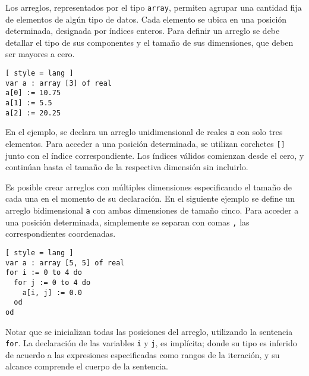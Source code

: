 Los arreglos, representados por el tipo \lstinline[style = lang]{array}, permiten agrupar una cantidad fija de elementos de algún tipo de datos.
Cada elemento se ubica en una posición determinada, designada por índices enteros.
Para definir un arreglo se debe detallar el tipo de sus componentes y el tamaño de sus dimensiones, que deben ser mayores a cero.

\begin{lstlisting}[ style = lang ]
var a : array [3] of real
a[0] := 10.75
a[1] := 5.5
a[2] := 20.25
\end{lstlisting}

\iffalse
Un tipo puntero \lstinline[style = lang]{pointer}, es un elemento que direcciona a una estructura en memoria.
Son utilizados para reservar, alojar, y liberar memoria a lo largo de la ejecución del programa.
Debido a su relevancia en el manejo dinámico de memoria, relegaremos su estudio hasta la sección correspondiente.

\begin{lstlisting}[ style = lang ]
var p : pointer of int
alloc(p)
#p := 5
free(p)
\end{lstlisting}
\fi

En el ejemplo, se declara un arreglo unidimensional de reales \lstinline[style = lang]{a} con solo tres elementos.
Para acceder a una posición determinada, se utilizan corchetes \lstinline[style = lang]{[]} junto con el índice correspondiente.
Los índices válidos comienzan desde el cero, y continúan hasta el tamaño de la respectiva dimensión sin incluirlo.

Es posible crear arreglos con múltiples dimensiones especificando el tamaño de cada una en el momento de su declaración.
En el siguiente ejemplo se define un arreglo bidimensional \lstinline[style = lang]{a} con ambas dimensiones de tamaño cinco.
Para acceder a una posición determinada, simplemente se separan con comas \lstinline[style = lang]{,} las correspondientes coordenadas.

\begin{lstlisting}[ style = lang ]
var a : array [5, 5] of real
for i := 0 to 4 do
  for j := 0 to 4 do
    a[i, j] := 0.0
  od
od
\end{lstlisting}

Notar que se inicializan todas las posiciones del arreglo, utilizando la sentencia \lstinline[style = lang]{for}.
La declaración de las variables \lstinline[style = lang]{i} y \lstinline[style = lang]{j}, es implícita; donde su tipo es inferido de acuerdo a las expresiones especificadas como rangos de la iteración, y su alcance comprende el cuerpo de la sentencia.

